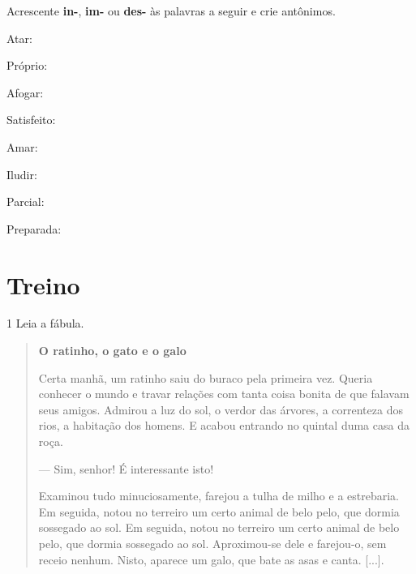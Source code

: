 Acrescente \textbf{in-}, \textbf{im-} ou \textbf{des-} às palavras a seguir e crie antônimos.

\begin{escolha}[itemsep=-5pt]
\item Atar: 

\item Próprio: 

\item Afogar: 

\item Satisfeito: 

\item Amar: 

\item Iludir: 

\item Parcial: 

\item Preparada: 
\end{escolha}

\section{Treino}

\num{1} Leia a fábula.

\begin{quote}
\textbf{O ratinho, o gato e o galo}

Certa manhã, um ratinho saiu do buraco pela primeira vez. Queria
conhecer o mundo e travar relações com tanta coisa bonita de que falavam
seus amigos. Admirou a luz do sol, o verdor das árvores, a correnteza
dos rios, a habitação dos homens. E acabou entrando no quintal duma casa
da roça.

--- Sim, senhor! É interessante isto!

Examinou tudo minuciosamente, farejou a tulha de milho e a estrebaria.
Em seguida, notou no terreiro um certo animal de belo pelo, que dormia
sossegado ao sol. Em seguida, notou no terreiro um certo animal de belo
pelo, que dormia sossegado ao sol. Aproximou-se dele e farejou-o, sem
receio nenhum. Nisto, aparece um galo, que bate as asas e canta.
{[}...{]}.

\end{quote}

